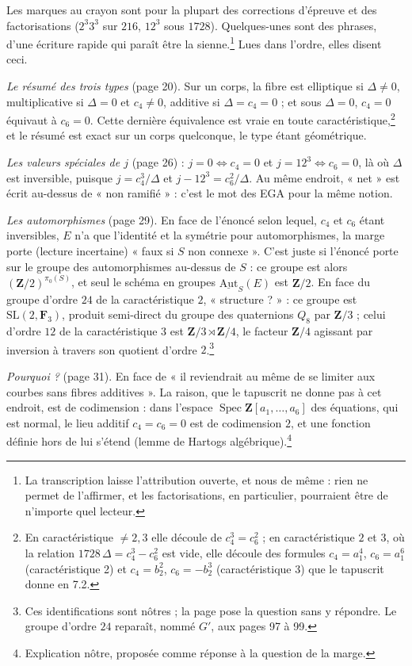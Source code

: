 \documentclass[11pt,a4paper]{article}
\begin{document}
Les marques au crayon sont pour la plupart des corrections d'épreuve et des
factorisations ($2^3 3^3$ sur $216$, $12^3$ sous $1728$). Quelques-unes sont
des phrases, d'une écriture rapide qui paraît être la sienne.\footnote{La
transcription laisse l'attribution ouverte, et nous de même : rien ne permet de
l'affirmer, et les factorisations, en particulier, pourraient être de
n'importe quel lecteur.} Lues dans l'ordre, elles disent ceci.

\emph{Le résumé des trois types} (page 20). Sur un corps, la fibre est
elliptique si $\Delta \neq 0$, multiplicative si $\Delta = 0$ et $c_4 \neq 0$,
additive si $\Delta = c_4 = 0$ ; et sous $\Delta = 0$, $c_4 = 0$ équivaut à
$c_6 = 0$. Cette dernière équivalence est vraie en toute
caractéristique,\footnote{En caractéristique $\neq 2,3$ elle découle de $c_4^3
= c_6^2$ ; en caractéristique $2$ et $3$, où la relation $1728\,\Delta = c_4^3 -
c_6^2$ est vide, elle découle des formules $c_4 = a_1^4$, $c_6 = a_1^6$
(caractéristique 2) et $c_4 = b_2^2$, $c_6 = -b_2^3$ (caractéristique 3) que le
tapuscrit donne en 7.2.} et le résumé est exact sur un corps quelconque, le
type étant géométrique.

\emph{Les valeurs spéciales de $j$} (page 26) : $j = 0 \Leftrightarrow c_4 = 0$
et $j = 12^3 \Leftrightarrow c_6 = 0$, là où $\Delta$ est inversible, puisque
$j = c_4^3/\Delta$ et $j - 12^3 = c_6^2/\Delta$. Au même endroit, « net » est
écrit au-dessus de « non ramifié » : c'est le mot des EGA pour la même notion.

\emph{Les automorphismes} (page 29). En face de l'énoncé selon lequel, $c_4$ et
$c_6$ étant inversibles, $E$ n'a que l'identité et la symétrie pour
automorphismes, la marge porte (lecture incertaine) « faux si $S$ non
connexe ». C'est juste si l'énoncé porte sur le groupe des automorphismes
au-dessus de $S$ : ce groupe est alors $(\mathbf{Z}/2)^{\pi_0(S)}$, et seul le
schéma en groupes $\underline{\mathrm{Aut}}_S(E)$ est $\mathbf{Z}/2$. En face du
groupe d'ordre $24$ de la caractéristique $2$, « structure ? » : ce groupe est
$\mathrm{SL}(2,\mathbf{F}_3)$, produit semi-direct du groupe des quaternions
$Q_8$ par $\mathbf{Z}/3$ ; celui d'ordre $12$ de la caractéristique $3$ est
$\mathbf{Z}/3 \rtimes \mathbf{Z}/4$, le facteur $\mathbf{Z}/4$ agissant par
inversion à travers son quotient d'ordre $2$.\footnote{Ces identifications sont
nôtres ; la page pose la question sans y répondre. Le groupe d'ordre $24$
reparaît, nommé $G'$, aux pages 97 à 99.}

\emph{Pourquoi ?} (page 31). En face de « il reviendrait au même de se limiter
aux courbes sans fibres additives ». La raison, que le tapuscrit ne donne pas
à cet endroit, est de codimension : dans l'espace $\operatorname{Spec}
\mathbf{Z}[a_1,\ldots,a_6]$ des équations, qui est normal, le lieu additif $c_4
= c_6 = 0$ est de codimension $2$, et une fonction définie hors de lui s'étend
(lemme de Hartogs algébrique).\footnote{Explication nôtre, proposée comme
réponse à la question de la marge.}
\end{document}
